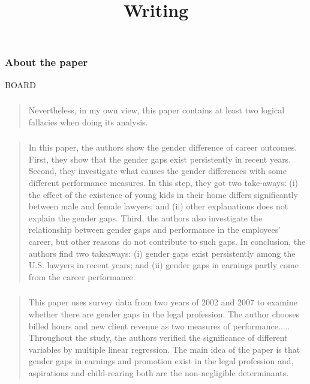 \documentclass[notes=show,beamer,compress]{beamer}
\begin{document}
\begin{frame}
\title{Writing}
\date{}
\titlepage
\end{frame}

\section*{}

\begin{frame}\frametitle{About the paper}
BOARD
\end{frame}


\begin{frame}\frametitle{}
\begin{quote}
Nevertheless, in my own view, this paper contains at least two logical fallacies when doing its analysis.
\end{quote}
\end{frame}

\begin{frame}\frametitle{}
\begin{quote}
 In this paper, the authors show the gender difference of career outcomes. First, they show that
the gender gaps exist persistently in recent years. Second, they investigate what causes the gender
differences with some different performance measures. In this step, they got two take-aways: (i)
the effect of the existence of young kids in their home differs significantly between male and female
lawyers; and (ii) other explanations does not explain the gender gaps. Third, the authors also
investigate the relationship between gender gaps and performance in the employees’ career, but
other reasons do not contribute to such gaps. In conclusion, the authors find two takeaways: (i)
gender gaps exist persistently among the U.S. lawyers in recent years; and (ii) gender gaps in
earnings partly come from the career performance.
\end{quote}
\end{frame}

\begin{frame}\frametitle{}
\begin{quote}
This paper uses survey data from two years of 2002 and 2007 to examine whether there
are gender gaps in the legal profession. The author chooses billed hours and new client
revenue as two measures of performance..... Throughout the study,
the authors verified the significance of different variables by multiple linear regression. The
main idea of the paper is that gender gaps in earnings and promotion exist in the legal
profession and, aspirations and child-rearing both are the non-negligible determinants.
\end{quote}
\end{frame}
\end{document}
